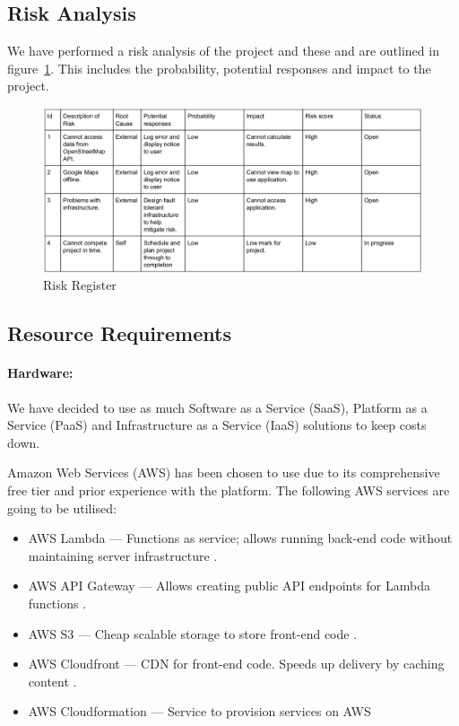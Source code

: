 \documentclass[a4paper,11pt]{article}
\begin{document}
\subsection{Risk Analysis}

We have performed a risk analysis of the project and these and are outlined in
figure~\ref{fig:risk-register}. This includes the probability, potential
responses and impact to the project.

\begin{figure}[H]
  \includegraphics[width=\textwidth]{risk-register}
  \caption{Risk Register}\label{fig:risk-register}
\end{figure}

\subsection{Resource Requirements}

\paragraph{Hardware:}

We have decided to use as much Software as a Service (SaaS), Platform as a
Service (PaaS) and Infrastructure as a Service (IaaS) solutions to keep costs
down.

Amazon Web Services (AWS) has been chosen to use due to its comprehensive free
tier and prior experience with the platform. The following AWS services are
going to be utilised:

\begin{itemize}
  \item AWS Lambda --- Functions as service; allows running back-end code
    without maintaining server infrastructure \autocite{aws:2}.
  \item AWS API Gateway --- Allows creating public API endpoints for Lambda
    functions \autocite{aws:3}.
  \item AWS S3 --- Cheap scalable storage to store front-end code
    \autocite{aws:4}.
  \item AWS Cloudfront --- CDN for front-end code. Speeds up delivery by caching
    content \autocite{aws:5}.
  \item AWS Cloudformation --- Service to provision services on AWS
    \autocite{aws:6}
\end{itemize}
\end{document}
